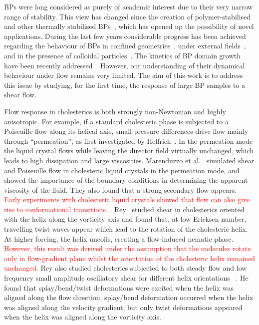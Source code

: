 \documentclass[8.5pt,twoside,twocolumn]{article}
\newcommand{\rev}[1]{{\textcolor{red}{#1}}}
\begin{document}
BPs were long considered as purely of academic interest due to their very narrow 
range of stability. This view has changed since the creation of polymer-stabilised and other thermally 
stabilised BPs~\cite{Kikuchi:2002,Coles:2005}, which has opened up the 
possibility of novel applications.
During the last few years considerable progress has been achieved regarding the behaviour 
of BPs in confined geometries~\cite{Fukuda:2010a, Fukuda:2010b, Ravnik:2011b}, under 
external fields~\cite{Alexander:2008,Fukuda:2009,Henrich:2010a,Castles:2010,Tiribocchi:2011a}, 
and in the presence of colloidal particles~\cite{Ravnik:2011a}.
The kinetics of BP domain growth have been recently addressed~\cite{Henrich:2010b}. 
However, our understanding of their dynamical behaviour under flow remains
very limited. The aim of this work is to address this issue by studying,
for the first time, the response of large BP samples to a shear flow.

Flow response in cholesterics is both strongly non-Newtonian and highly anisotropic.
For example, if a standard cholesteric phase is subjected to a Poiseuille flow along
its helical axis, small pressure differences drive flow mainly through
``permeation'', as first investigated by Helfrich~\cite{Helfrich:1969}.
In the permeation mode the liquid crystal flows while leaving the director
field virtually unchanged, which leads to high dissipation and large
viscosities. Marenduzzo et al.~\cite{Marenduzzo:2006a,Marenduzzo:2006b} simulated 
shear and Poiseuille flow in cholesteric liquid crystals in the permeation mode, and 
showed the importance of the boundary conditions in determining the apparent viscosity of the fluid. 
They also found that a strong secondary flow appears.
\rev{
Early experiments with cholesteric liquid crystals
showed that flow can also give rise to conformational transitions. \cite{Press:1978}.
}
Rey~\cite{Rey:1996a, Rey:1996b} studied shear in cholesterics oriented with the helix along 
the vorticity axis and found that, at low Ericksen number, travelling twist waves appear which 
lead to the rotation of the cholesteric helix. At higher forcing, the helix uncoils, creating a flow-induced nematic phase. 
\rev{
However, this result was derived under the 
assumption that the molecules rotate only in flow-gradient plane whilst
the orientation of the cholesteric helix remained unchanged.
}  
Rey also studied cholesterics subjected to both steady flow and low frequency
small amplitude oscillatory shear for different helix orientations
~\cite{Rey:2000, Rey:2002}. He found that splay/bend/twist deformations were
excited when the helix was aligned along the flow direction; splay/bend
deformation occurred when the helix was aligned along the velocity gradient;
but only twist deformations
appeared when the helix was aligned along the vorticity axis.
\end{document}
